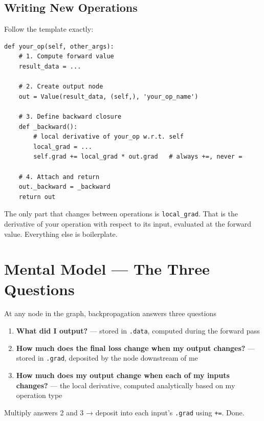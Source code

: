 \documentclass[12pt,a4paper]{article}
\newcommand{\code}[1]{\texttt{\small\color{deepblue}#1}}
\begin{document}
\subsection{Writing New Operations}

Follow the template exactly:

\begin{lstlisting}
def your_op(self, other_args):
    # 1. Compute forward value
    result_data = ...

    # 2. Create output node
    out = Value(result_data, (self,), 'your_op_name')

    # 3. Define backward closure
    def _backward():
        # local derivative of your_op w.r.t. self
        local_grad = ...
        self.grad += local_grad * out.grad   # always +=, never =

    # 4. Attach and return
    out._backward = _backward
    return out
\end{lstlisting}

The only part that changes between operations is \code{local\_grad}. That is the derivative of your operation with respect to its input, evaluated at the forward value. Everything else is boilerplate.

\section{Mental Model — The Three Questions}

\begin{conceptbox}{At any node in the graph, backpropagation answers three questions}
\begin{enumerate}
  \item \textbf{What did I output?} — stored in \code{.data}, computed during the forward pass
  \item \textbf{How much does the final loss change when my output changes?} — stored in \code{.grad}, deposited by the node downstream of me
  \item \textbf{How much does my output change when each of my inputs changes?} — the local derivative, computed analytically based on my operation type
\end{enumerate}
Multiply answers 2 and 3 → deposit into each input's \code{.grad} using \code{+=}. Done.
\end{conceptbox}
\end{document}
